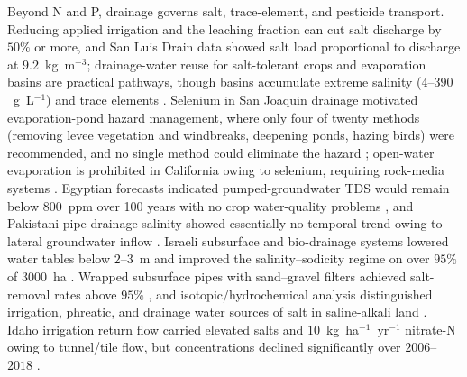 Beyond N and P, drainage governs salt, trace-element, and pesticide
transport. Reducing applied irrigation and the leaching fraction can cut
salt discharge by $50\%$ or more, and San Luis Drain data showed salt load
proportional to discharge at $9.2$~kg~m$^{-3}$; drainage-water reuse for
salt-tolerant crops and evaporation basins are practical pathways, though
basins accumulate extreme salinity ($4$--$390$~g~L$^{-1}$) and trace
elements \parencite{WESTCOT1988}. Selenium in San Joaquin drainage
motivated evaporation-pond hazard management, where only four of twenty
methods (removing levee vegetation and windbreaks, deepening ponds, hazing
birds) were recommended, and no single method could eliminate the hazard
\parencite{BRADFORD1991}; open-water evaporation is prohibited in
California owing to selenium, requiring rock-media systems
\parencite{Ayars2014}. Egyptian forecasts indicated pumped-groundwater TDS
would remain below $800$~ppm over 100 years with no crop water-quality
problems \parencite{RADSTAKE1988}, and Pakistani pipe-drainage salinity
showed essentially no temporal trend owing to lateral groundwater inflow
\parencite{Kelleners1998}. Israeli subsurface and bio-drainage systems
lowered water tables below $2$--$3$~m and improved the salinity--sodicity
regime on over $95\%$ of $3000$~ha \parencite{Gafni2001}. Wrapped
subsurface pipes with sand--gravel filters achieved salt-removal rates
above $95\%$ \parencite{Wang2024e}, and isotopic/hydrochemical analysis
distinguished irrigation, phreatic, and drainage water sources of salt in
saline-alkali land \parencite{Zhou2023}. Idaho irrigation return flow
carried elevated salts and $10$~kg~ha$^{-1}$~yr$^{-1}$ nitrate-N owing to
tunnel/tile flow, but concentrations declined significantly over
$2006$--$2018$ \parencite{Bjorneberg2020}.

